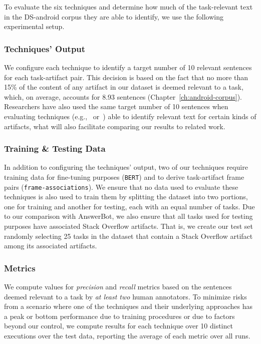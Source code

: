 To evaluate the six techniques and determine how much of the task-relevant text in the \acs{DS-android} corpus they are able to identify, we use the following experimental setup.

\subsubsection{Techniques' Output}


We configure each technique to identify a target number of 10 relevant sentences for each task-artifact pair.
This decision is based on the fact that no more than 15\% of the content of any artifact in our dataset is deemed relevant to a task, which, on average, accounts for 8.93 sentences (Chapter~\ref{ch:android-corpus}).
Researchers have also used the same target number of 10 sentences when evaluating techniques  (e.g.,~\cite{Xu2017} or~\cite{Lotufo2012}) able to identify relevant text for certain kinds of artifacts, what will also facilitate comparing our results to related work.


\subsubsection{Training \& Testing Data}


In addition to configuring the techniques' output, two of our techniques require training data for fine-tuning purposes (\texttt{BERT}) and to derive task-artifact frame pairs (\texttt{frame-associations}).
We ensure that no data used to evaluate these techniques is also used to train them by 
splitting the dataset into two portions, one for training and another for testing, each with an equal number of tasks.
Due to our comparison with AnswerBot, we also ensure that all tasks used for testing purposes have associated Stack Overflow artifacts.
That is, we create our test set randomly selecting 25 tasks in the dataset that contain a 
Stack Overflow artifact among its associated artifacts.




\subsubsection{Metrics}



We compute values for \textit{precision} and \textit{recall} metrics based on the sentences 
deemed relevant to a task by \textit{at least two} human annotators.
To minimize risks from a scenario where one of the techniques and their underlying approaches has a peak or
bottom performance due to training procedures or due to factors beyond our control, 
we compute results for each technique over 10 distinct executions over the test data, 
reporting the average of each metric over all runs.




